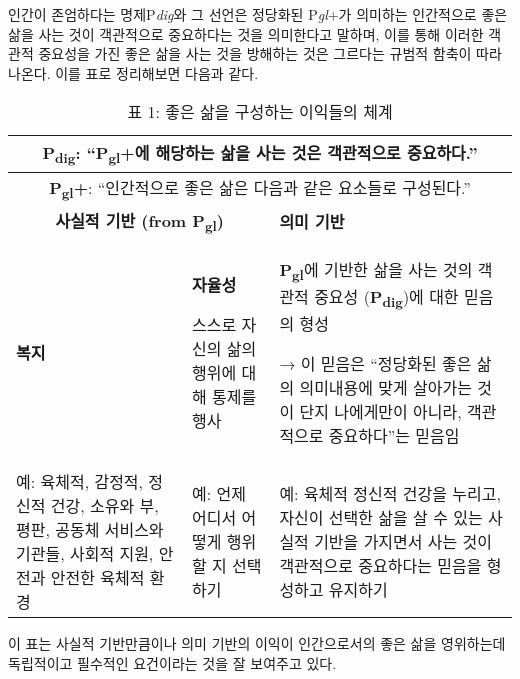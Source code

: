 인간이 존엄하다는 명제P\emph{dig}와 그 선언은 정당화된 P\emph{gl}+가 의미하는 인간적으로 좋은 삶을 사는 것이 객관적으로 중요하다는 것을 의미한다고 말하며, 이를 통해 이러한 객관적 중요성을 가진 좋은 삶을 사는 것을 방해하는 것은 그르다는 규범적 함축이 따라나온다. 이를 표로 정리해보면 다음과 같다.

\renewcommand{\arraystretch}{1.5} %

\begin{table}[H]
\centering
\caption*{표 1: 좋은 삶을 구성하는 이익들의 체계}

\begin{tabular}{|p{4.2cm}|p{4.2cm}|p{6.6cm}|}
\hline
\multicolumn{3}{|c|}{\textbf{P\textsubscript{dig}}: ``P\textsubscript{gl}+에 해당하는 삶을 사는 것은 객관적으로 중요하다.''} \\
\hline
\multicolumn{3}{|c|}{\textbf{P\textsubscript{gl}+}: ``인간적으로 좋은 삶은 다음과 같은 요소들로 구성된다.''} \\
\hline
\multicolumn{2}{|c|}{\textbf{사실적 기반 (from P\textsubscript{gl})}} & \textbf{의미 기반} \\
\hline
\textbf{복지} & \textbf{자율성} 

\vspace{0.5em}

스스로 자신의 삶의 행위에 대해 통제를 행사 & 
\textbf{P\textsubscript{gl}}에 기반한 삶을 사는 것의 객관적 중요성 
(\textbf{P\textsubscript{dig}})에 대한 믿음의 형성

\vspace{0.5em}

→ 이 믿음은 ``정당화된 좋은 삶의 의미내용에 맞게 살아가는 것이 단지 나에게만이 아니라, 객관적으로 중요하다''는 믿음임 \\
\hline
예: 육체적, 감정적, 정신적 건강, 소유와 부, 평판, 공동체 서비스와 기관들, 사회적 지원, 안전과 안전한 육체적 환경
& 예: 언제 어디서 어떻게 행위할 지 선택하기 
& 예: 육체적 정신적 건강을 누리고, 자신이 선택한 삶을 살 수 있는 사실적 기반을 가지면서 사는 것이 객관적으로 중요하다는 믿음을 형성하고 유지하기 \\
\hline
\end{tabular}
\end{table}

이 표는 사실적 기반만큼이나 의미 기반의 이익이 인간으로서의 좋은 삶을 영위하는데 독립적이고 필수적인 요건이라는 것을 잘 보여주고 있다.

